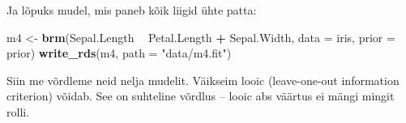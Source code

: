 \documentclass[]{book}
\newenvironment{Shaded}{\begin{snugshade}}{\end{snugshade}}
\newcommand{\DataTypeTok}[1]{\textcolor[rgb]{0.13,0.29,0.53}{#1}}
\newcommand{\KeywordTok}[1]{\textcolor[rgb]{0.13,0.29,0.53}{\textbf{#1}}}
\newcommand{\NormalTok}[1]{#1}
\newcommand{\OperatorTok}[1]{\textcolor[rgb]{0.81,0.36,0.00}{\textbf{#1}}}
\newcommand{\StringTok}[1]{\textcolor[rgb]{0.31,0.60,0.02}{#1}}
\begin{document}
Ja lõpuks mudel, mis paneb kõik liigid ühte patta:

\begin{Shaded}
\begin{Highlighting}[]
\NormalTok{m4 <-}\StringTok{ }\KeywordTok{brm}\NormalTok{(Sepal.Length }\OperatorTok{~}\StringTok{ }\NormalTok{Petal.Length }\OperatorTok{+}\StringTok{ }\NormalTok{Sepal.Width, }
          \DataTypeTok{data =}\NormalTok{ iris, }
          \DataTypeTok{prior =}\NormalTok{ prior)}
\KeywordTok{write_rds}\NormalTok{(m4, }\DataTypeTok{path =} \StringTok{"data/m4.fit"}\NormalTok{)}
\end{Highlighting}
\end{Shaded}

Siin me võrdleme neid nelja mudelit. Väikseim looic (leave-one-out information criterion) võidab. See on suhteline võrdlus -- looic abs väärtus ei mängi mingit rolli.
\end{document}

